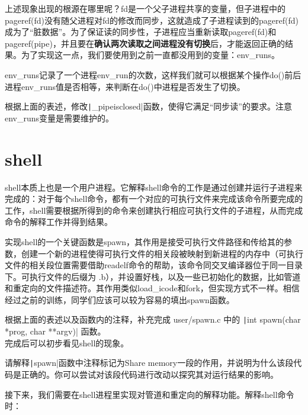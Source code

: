 上述现象出现的根源在哪里呢？fd是一个父子进程共享的变量，但子进程中的pageref(fd)没有随父进程对fd的修改而同步，这就造成了子进程读到的pageref(fd)成为了“脏数据”。为了保证读的同步性，子进程应当重新读取pageref(fd)和pageref(pipe)，并且要在\textbf{确认两次读取之间进程没有切换}后，才能返回正确的结果。为了实现这一点，我们要使用到之前一直都没用到的变量：env\_runs。

env\_runs记录了一个进程env\_run的次数，这样我们就可以根据某个操作do()前后进程env\_runs值是否相等，来判断在do()中进程是否发生了切换。

\begin{exercise}
	根据上面的表述，修改\texttt|_pipeisclosed|函数，使得它满足“同步读”的要求。注意env\_runs变量是需要维护的。
\end{exercise}

\section{shell}

shell本质上也是一个用户进程。它解释shell命令的工作是通过创建并运行子进程来完成的：对于每个shell命令，都有一个对应的可执行文件来完成该命令所要完成的工作，shell需要根据所得到的命令来创建执行相应可执行文件的子进程，从而完成命令的解释工作并得到结果。

实现shell的一个关键函数是spawn，其作用是接受可执行文件路径和传给其的参数，创建一个新的进程使得可执行文件的相关段被映射到新进程的内存中（可执行文件的相关段位置需要借助readelf命令的帮助，该命令同交叉编译器位于同一目录下。可执行文件的后缀为 .b），并设置好栈，以及一些已初始化的数据，比如管道和重定向的文件描述符。其作用类似load\_icode和fork，但实现方式不一样。相信经过之前的训练，同学们应该可以较为容易的填出spawn函数。

\begin{exercise}
  根据上面的表述以及函数内的注释，补充完成 user/spawn.c 中的 \texttt|int spawn(char *prog, char **argv)| 函数。\\
  完成后可以初步看见shell的现象。
\end{exercise}

\begin{thinking}\label{think-spawn}
  请解释\texttt|spawn|函数中注释标记为Share memory一段的作用，并说明为什么该段代码是正确的。你可以尝试对该段代码进行改动以探究其对运行结果的影响。
\end{thinking}

接下来，我们需要在shell进程里实现对管道和重定向的解释功能。解释shell命令时：

